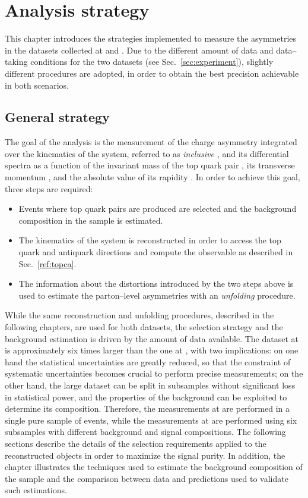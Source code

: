 \chapter{Analysis strategy}
\label{sec:strategy}

This chapter introduces the strategies implemented to measure the
asymmetries in the datasets collected at \seventev{} and \eighttev{}.
Due to the different amount of data and data--taking conditions for
the two datasets (see Sec.~\ref{sec:experiment}), slightly different
procedures are adopted, in order to obtain the best precision
achievable in both scenarios. 

\section{General strategy}

The goal of the analysis is the measurement of the charge asymmetry
\ac{} integrated over the kinematics of the \ttbar{} system,
referred to as {\it inclusive \ac{}}, and its differential spectra as
a function of the invariant mass of the top quark pair \mtt{}, its
transverse momentum \pttt{}, and the absolute value of its rapidity
\ytt{}. In order to achieve this goal, three steps are required:
\begin{itemize}
\item Events where top quark pairs are produced are selected and the
  background composition in the sample is estimated.
\item The kinematics of the \ttbar{} system is reconstructed in order
  to access the top quark and antiquark directions and compute the
  \dy{} observable as described in Sec.~\ref{ref:topca}.
\item The information about the distortions introduced by the two
  steps above is used to estimate the parton--level asymmetries with
  an {\it unfolding} procedure.
\end{itemize}

While the same reconstruction and unfolding procedures, described in
the following chapters, are used for both datasets, the selection
strategy and the background estimation is driven by the amount of data
available. 
The dataset at \eighttev{} is approximately six times larger than the
one at \seventev{}, with two implications: on one hand the statistical
uncertainties are greatly reduced, so that the constraint of
systematic uncertainties becomes crucial to perform precise
measurements; on the other hand, the large dataset can be split in
subsamples without significant loss in statistical power, and the
properties of the background can be exploited to determine
its composition. Therefore, the measurements at \seventev{} are
performed in a single pure sample of \ttbar{} events, while the
measurements at \eighttev{} are performed using six subsamples with
different background and signal compositions. The following sections
describe the details of the selection requirements applied to the
reconstructed objects in order to maximize the \ttbar{} signal
purity. 
In addition, the chapter illustrates the techniques used to estimate
the background composition of the sample and the comparison between
data and predictions used to validate such estimations.

